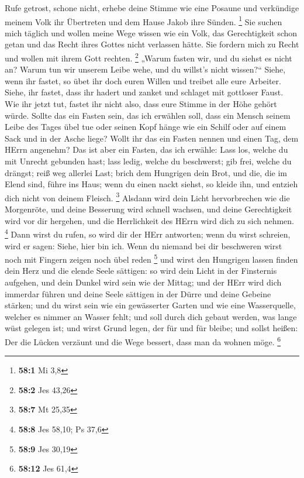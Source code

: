  Rufe getrost, schone nicht, erhebe deine Stimme wie eine
Posaune und verkündige meinem Volk ihr Übertreten und dem Hause Jakob
ihre Sünden. \footnote{\textbf{58:1} Mi 3,8}  Sie suchen
mich täglich und wollen meine Wege wissen wie ein Volk, das
Gerechtigkeit schon getan und das Recht ihres Gottes nicht verlassen
hätte. Sie fordern mich zu Recht und wollen mit ihrem Gott rechten.
\footnote{\textbf{58:2} Jes 43,26}  „Warum fasten wir, und
du siehst es nicht an? Warum tun wir unserem Leibe wehe, und du willst's
nicht wissen?{}`` Siehe, wenn ihr fastet, so übet ihr doch euren Willen
und treibet alle eure Arbeiter.  Siehe, ihr fastet, dass ihr
hadert und zanket und schlaget mit gottloser Faust. Wie ihr jetzt tut,
fastet ihr nicht also, dass eure Stimme in der Höhe gehört würde.
 Sollte das ein Fasten sein, das ich erwählen soll, dass ein
Mensch seinem Leibe des Tages übel tue oder seinen Kopf hänge wie ein
Schilf oder auf einem Sack und in der Asche liege? Wollt ihr das ein
Fasten nennen und einen Tag, dem HErrn angenehm?  Das ist
aber ein Fasten, das ich erwähle: Lass los, welche du mit Unrecht
gebunden hast; lass ledig, welche du beschwerst; gib frei, welche du
drängst; reiß weg allerlei Last;  brich dem Hungrigen dein
Brot, und die, die im Elend sind, führe ins Haus; wenn du einen nackt
siehst, so kleide ihn, und entzieh dich nicht von deinem Fleisch.
\footnote{\textbf{58:7} Mt 25,35}  Alsdann wird dein Licht
hervorbrechen wie die Morgenröte, und deine Besserung wird schnell
wachsen, und deine Gerechtigkeit wird vor dir hergehen, und die
Herrlichkeit des HErrn wird dich zu sich nehmen. \footnote{\textbf{58:8}
  Jes 58,10; Ps 37,6}  Dann wirst du rufen, so wird dir der
HErr antworten; wenn du wirst schreien, wird er sagen: Siehe, hier bin
ich. Wenn du niemand bei dir beschweren wirst noch mit Fingern zeigen
noch übel reden \footnote{\textbf{58:9} Jes 30,19}  und
wirst den Hungrigen lassen finden dein Herz und die elende Seele
sättigen: so wird dein Licht in der Finsternis aufgehen, und dein Dunkel
wird sein wie der Mittag;  und der HErr wird dich immerdar
führen und deine Seele sättigen in der Dürre und deine Gebeine stärken;
und du wirst sein wie ein gewässerter Garten und wie eine Wasserquelle,
welcher es nimmer an Wasser fehlt;  und soll durch dich
gebaut werden, was lange wüst gelegen ist; und wirst Grund legen, der
für und für bleibe; und sollst heißen: Der die Lücken verzäunt und die
Wege bessert, dass man da wohnen möge. \footnote{\textbf{58:12} Jes 61,4}
